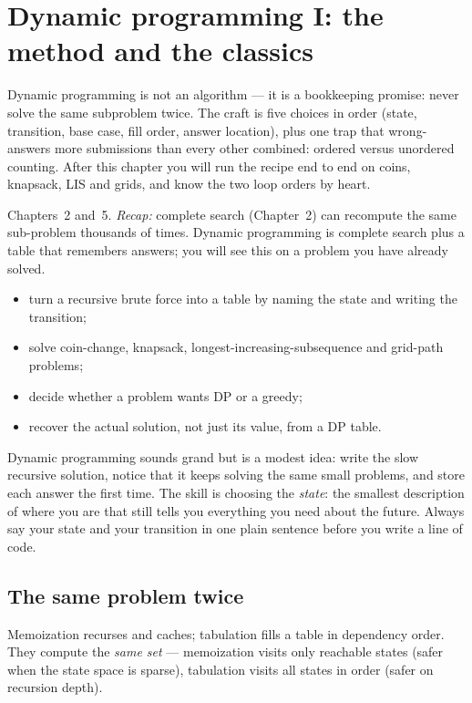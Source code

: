 \chapter{Dynamic programming I: the method and the classics}\label{ch:dp1}

Dynamic programming is not an algorithm --- it is a bookkeeping
promise: never solve the same subproblem twice. The craft is five
choices in order (state, transition, base case, fill order, answer
location), plus one trap that wrong-answers more submissions than
every other combined: ordered versus unordered counting. After this
chapter you will run the recipe end to end on coins, knapsack, LIS
and grids, and know the two loop orders by heart.

\begin{rulebox}
Chapters~2 and~5. \emph{Recap:} complete search (Chapter~2) can recompute the same sub-problem thousands of times. Dynamic programming is complete search plus a table that remembers answers; you will see this on a problem you have already solved.
\end{rulebox}
\begin{wins}
\begin{itemize}
\item turn a recursive brute force into a table by naming the state and writing the transition;
\item solve coin-change, knapsack, longest-increasing-subsequence and grid-path problems;
\item decide whether a problem wants DP or a greedy;
\item recover the actual solution, not just its value, from a DP table.
\end{itemize}
\end{wins}
\begin{principle}
Dynamic programming sounds grand but is a modest idea: write the slow recursive solution, notice that it keeps solving the same small problems, and store each answer the first time. The skill is choosing the \emph{state}: the smallest description of where you are that still tells you everything you need about the future. Always say your state and your transition in one plain sentence before you write a line of code.
\end{principle}

\section{The same problem twice}\label{sec:memo}
Memoization recurses and caches; tabulation fills a table in
dependency order. They compute the \emph{same set} --- memoization
visits only reachable states (safer when the state space is sparse),
tabulation visits all states in order (safer on recursion depth).

